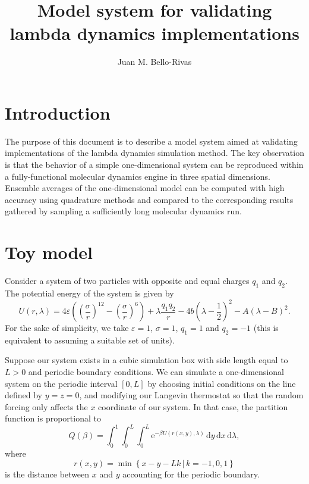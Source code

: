\documentclass{amsart}
\begin{document}
\title[Model system for lambda dynamics]{Model system for validating lambda dynamics implementations}
\author{Juan M. Bello-Rivas}
\date{}
\maketitle

\setcounter{tocdepth}{2}
\tableofcontents

\section{Introduction}

The purpose of this document is to describe a model system aimed at validating implementations of the lambda dynamics simulation method.
The key observation is that the behavior of a simple one-dimensional system can be reproduced within a fully-functional molecular dynamics engine in three spatial dimensions.
Ensemble averages of the one-dimensional model can be computed with high accuracy using quadrature methods and compared to the corresponding results gathered by sampling a sufficiently long molecular dynamics run.

\section{Toy model}

Consider a system of two particles with opposite and equal charges $q_1$ and $q_2$.
The potential energy of the system is given by
\begin{equation*}
  U(r, \lambda)
  =
  4 \varepsilon \left( \left( \frac{\sigma}{r} \right)^{12} - \left( \frac{\sigma}{r} \right)^{6} \right)
  +
  \lambda \frac{q_1 q_2}{r}
  -
  4 b \left( \lambda - \frac{1}{2} \right)^2
  -
  A \left( \lambda - B \right)^2.
\end{equation*}
For the sake of simplicity, we take $\varepsilon = 1$, $\sigma = 1$, $q_1 = 1$ and $q_2 = -1$ (this is equivalent to assuming a suitable set of units).

Suppose our system exists in a cubic simulation box with side length equal to $L > 0$ and periodic boundary conditions.
We can simulate a one-dimensional system on the periodic interval $[0, L]$ by choosing initial conditions on the line defined by $y = z = 0$, and modifying our Langevin thermostat so that the random forcing only affects the $x$ coordinate of our system.
In that case, the partition function is proportional to
\begin{equation*}
  Q(\beta)
  =
  \int_0^1 \int_0^L \int_0^L \mathrm{e}^{-\beta U(r(x, y), \lambda)} \, \mathrm{d} y \, \mathrm{d} x \, \mathrm{d} \lambda,
\end{equation*}
where
\begin{equation*}
  r(x, y)
  =
  \min \left\{ x - y - L k \, | \, k = -1, 0, 1 \right\}
\end{equation*}
is the distance between $x$ and $y$ accounting for the periodic boundary.
\end{document}
